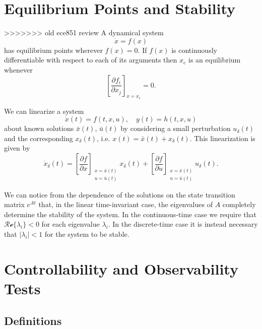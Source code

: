 \documentclass{report}
\begin{document}
\section{Equilibrium Points and Stability}
>>>>>>> old ece851 review
A dynamical system
$$
\dot{x} = f(x)
$$
has equilibrium points wherever $f(x) = 0$. If $f(x)$ is continuously
differentiable with respect to each of its arguments then $x_e$ is an
equilibrium whenever
$$
\left[\frac{\partial f_i}{\partial x_j}\right]_{x = x_e} = 0.
$$

We can linearize a system
$$
\dot{x}(t) = f(t, x, u), \quad
y(t) = h(t, x, u)
$$
about known solutions $\bar{x}(t)$,
$\bar{u}(t)$ by considering a small perturbation $u_\delta(t)$ and the
corresponding $x_\delta(t)$, i.e.
$x(t) = \bar{x}(t) + x_\delta(t)$. This linearization is given by
$$
\dot{x}_\delta(t) =
\left[\frac{\partial f}{\partial x}\right]
  _{\substack{x = \bar{x}(t) \\ u = \bar{u}(t)}}
x_\delta(t)
+
\left[\frac{\partial f}{\partial u}\right]
  _{\substack{x = \bar{x}(t) \\ u = \bar{u}(t)}}
u_\delta(t).
$$

We can notice from the dependence of the solutions on
the state transition matrix $e^{At}$ that, in the linear
time-invariant case, the eigenvalues of $A$
completely determine the stability of the system. In the
continuous-time case we require that
$\mathcal{Re}\{\lambda_i\} < 0$ for each eigenvalue $\lambda_i$. In
the discrete-time case it is instead necessary that
$|\lambda_i| < 1$ for the system to be stable.

\section{Controllability and Observability Tests}

\subsection{Definitions}
\end{document}
